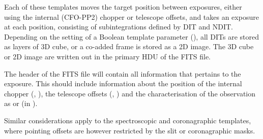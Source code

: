 Each of these templates moves the target position between exposures,
either using the internal (CFO-PP2) chopper or telescope offsets, and
takes an exposure at each position, consisting of subintegrations
defined by DIT and NDIT. Depending on the setting of a Boolean
template parameter (), all DITs are stored as
layers of 3D cube, or a co-added frame is stored as a 2D image. The 3D
cube or 2D image are written out in the primary HDU of the FITS file.

The header of the FITS file will contain all information that pertains
to the exposure. This should include information about the position of
the internal chopper (,
), the telescope offsets (,
) and the characterisation of the observation as
 or  (in ).

Similar considerations apply to the spectroscopic and coronagraphic
templates, where pointing offsets are however restricted by the slit
or coronagraphic masks.


